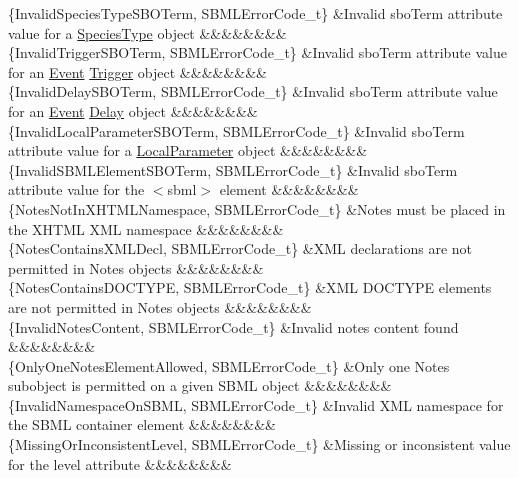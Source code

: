 \begin{DoxyParagraph}{}
\begin{longtabu}
\{Invalid\+Species\+Type\+S\+B\+O\+Term, S\+B\+M\+L\+Error\+Code\+\_\+t\} &Invalid \textquotesingle{}sbo\+Term\textquotesingle{} attribute value for a \hyperlink{class_species_type}{Species\+Type} object &&&&&&&&\\
\{Invalid\+Trigger\+S\+B\+O\+Term, S\+B\+M\+L\+Error\+Code\+\_\+t\} &Invalid \textquotesingle{}sbo\+Term\textquotesingle{} attribute value for an \hyperlink{class_event}{Event} \hyperlink{class_trigger}{Trigger} object &&&&&&&&\\
\{Invalid\+Delay\+S\+B\+O\+Term, S\+B\+M\+L\+Error\+Code\+\_\+t\} &Invalid \textquotesingle{}sbo\+Term\textquotesingle{} attribute value for an \hyperlink{class_event}{Event} \hyperlink{class_delay}{Delay} object &&&&&&&&\\
\{Invalid\+Local\+Parameter\+S\+B\+O\+Term, S\+B\+M\+L\+Error\+Code\+\_\+t\} &Invalid \textquotesingle{}sbo\+Term\textquotesingle{} attribute value for a \hyperlink{class_local_parameter}{Local\+Parameter} object &&&&&&&&\\
\{Invalid\+S\+B\+M\+L\+Element\+S\+B\+O\+Term, S\+B\+M\+L\+Error\+Code\+\_\+t\} &Invalid \textquotesingle{}sbo\+Term\textquotesingle{} attribute value for the {\ttfamily $<$sbml$>$} element &&&&&&&&\\
\{Notes\+Not\+In\+X\+H\+T\+M\+L\+Namespace, S\+B\+M\+L\+Error\+Code\+\_\+t\} &Notes must be placed in the X\+H\+T\+ML X\+ML namespace &&&&&&&&\\
\{Notes\+Contains\+X\+M\+L\+Decl, S\+B\+M\+L\+Error\+Code\+\_\+t\} &X\+ML declarations are not permitted in Notes objects &&&&&&&&\\
\{Notes\+Contains\+D\+O\+C\+T\+Y\+PE, S\+B\+M\+L\+Error\+Code\+\_\+t\} &X\+ML D\+O\+C\+T\+Y\+PE elements are not permitted in Notes objects &&&&&&&&\\
\{Invalid\+Notes\+Content, S\+B\+M\+L\+Error\+Code\+\_\+t\} &Invalid notes content found &&&&&&&&\\
\{Only\+One\+Notes\+Element\+Allowed, S\+B\+M\+L\+Error\+Code\+\_\+t\} &Only one Notes subobject is permitted on a given S\+B\+ML object &&&&&&&&\\
\{Invalid\+Namespace\+On\+S\+B\+ML, S\+B\+M\+L\+Error\+Code\+\_\+t\} &Invalid X\+ML namespace for the S\+B\+ML container element &&&&&&&&\\
\{Missing\+Or\+Inconsistent\+Level, S\+B\+M\+L\+Error\+Code\+\_\+t\} &Missing or inconsistent value for the \textquotesingle{}level\textquotesingle{} attribute &&&&&&&&\\

\end{longtabu}
\end{DoxyParagraph}
